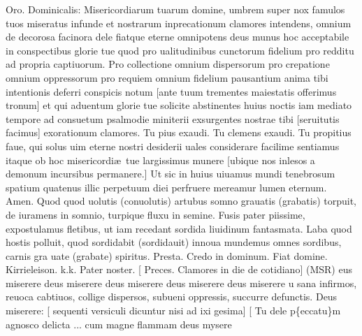 \documentclass[letter,12pt]{book}
\makeatletter
\newcommand*\zallmancaps{\usefont{U}{Zallman}{xl}{n}}
\DeclareRobustCommand{\Vbar}{\vers@resp{-0.1em}{V}}
\newcommand{\vers@resp@sym}{\raisebox{0.2ex}{\rotatebox[origin=c]{-20}{$\m@th\rceil$}}}
\newcommand{\vers@resp}[2]{%
  {\ooalign{\hidewidth\kern#1\vers@resp@sym\hidewidth\cr#2\cr}}%
}%
\def\V{\color{Red} \Vbar . \color{black}}
\makeatother
\begin{document}
\par {\small \color{Goldenrod} Oro. Dominicalis: Misericordiarum tuarum domine, umbrem super nox famulos tuos miseratus infunde et nostrarum inprecationum clamores intendens, omnium de decorosa facinora dele fiatque eterne omnipotens deus munus hoc acceptabile in conspectibus glorie tue quod pro ualitudinibus cunctorum fidelium pro redditu ad propria captiuorum. Pro collectione omnium dispersorum pro crepatione omnium oppressorum pro requiem omnium fidelium pausantium anima tibi intentionis deferri conspicis notum [ante tuum trementes maiestatis offerimus tronum] et qui aduentum glorie tue solicite abstinentes huius noctis iam mediato tempore ad consuetum psalmodie miniterii exsurgentes nostrae tibi [seruitutis facimus] exorationum clamores. Tu pius exaudi. Tu clemens exaudi. Tu propitius faue, qui solus uim eterne nostri desiderii uales considerare facilime sentiamus itaque ob hoc misericordi\ae \ tue largissimus munere [ubique nos inlesos a demonum incursibus permanere.] Ut sic in huius uiuamus mundi tenebrosum spatium quatenus illic perpetuum diei perfruere mereamur lumen eternum. Amen.}
\lettrine[lines=4]{\zallmancaps Q}{}uod quod uolutis (conuolutis) artubus somno grauatis (grabatis) torpuit, de iuramens in somnio, turpique fluxu in semine.
{\color{Red} F}usis pater piissime, expostulamus fletibus, ut iam recedant sordida liuidinum fantasmata.
{\color{Red} L}aba quod {\color{gray} hostis} polluit, quod sordidabit (sordidauit) innoua mundemus omnes sordibus, carnis gra{\color{gray} ua}te (grabate) spiritus.
{\color{Red} P}resta. %
{\color{Red} C}redo in dominum.
{\color{Red} F}iat domine.
{\color{Red} K}irrieleison. k.k.
{\color{Red} P}ater noster.
[{\color{Red} P}reces. {\small \color{Red} Clamores in die de cotidiano}] (MSR)
eus miserere deus miserere deus miserere deus miserere deus miserere
\newline {\V \color{Red} T}u sana infirmos, reuoca cabtiuos, collige dispersos, subueni oppressis, succurre defunctis.
{\color{Red} D}eus miserere: [{\small \color{Red} sequenti versiculi dicuntur nisi ad ixi gesima}]
\newline [{\color{Goldenrod} Tu dele p\{eccatu\}m agnosco delicta ... cum magne flammam deus mysere}
\end{document}
